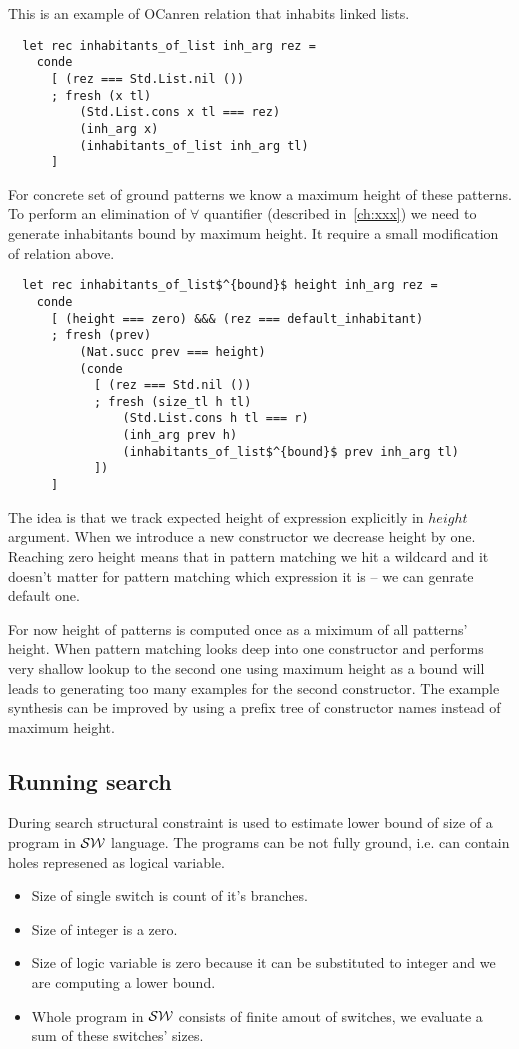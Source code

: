 This is an example of OCanren relation that inhabits linked lists.
\begin{lstlisting}
  let rec inhabitants_of_list inh_arg rez =
    conde
      [ (rez === Std.List.nil ())
      ; fresh (x tl)
          (Std.List.cons x tl === rez)
          (inh_arg x)
          (inhabitants_of_list inh_arg tl)
      ]
\end{lstlisting}

For concrete set of ground patterns we know a maximum height of these patterns. To perform an elimination of $\forall$ quantifier (described in~\ref{ch:xxx}) we need to generate inhabitants bound by maximum height. It require a small modification of relation above.

\begin{lstlisting}
  let rec inhabitants_of_list$^{bound}$ height inh_arg rez =
    conde
      [ (height === zero) &&& (rez === default_inhabitant)
      ; fresh (prev)
          (Nat.succ prev === height)
          (conde
            [ (rez === Std.nil ())
            ; fresh (size_tl h tl)
                (Std.List.cons h tl === r)
                (inh_arg prev h)
                (inhabitants_of_list$^{bound}$ prev inh_arg tl)
            ])
      ]
\end{lstlisting}

The idea is that we track expected height of expression explicitly in $height$ argument. When we introduce a new constructor we decrease height by one. Reaching zero height means that in pattern matching we hit a wildcard and it doesn't matter for pattern matching which expression it is -- we can genrate default one.

For now height of patterns is computed once as a miximum of all patterns' height. 
When pattern matching looks deep into one constructor and performs very shallow lookup to the second one using maximum height as a bound will leads to generating too many examples for the second constructor. The example synthesis can be improved by using a prefix tree of constructor names instead of maximum height.

\subsection{Running search}
During search structural constraint is used to estimate lower bound of size of a program in $\mathcal{S}\mathcal{W}$ language. The programs can be not fully ground, i.e. can contain holes represened as logical variable.
\begin{itemize}
\item Size of single switch is count of it's branches.
\item Size of integer is a zero.
\item Size of logic variable is zero because it can be substituted to integer and we are computing a lower bound.
\item Whole program in $\mathcal{S}\mathcal{W}$ consists of finite amout of switches, we evaluate a sum of these switches' sizes.
\end{itemize}

